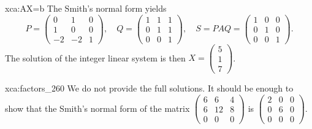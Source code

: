     

\begin{sol}{xca:AX=b}
	The Smith's normal form yields 
	\[
		P=\begin{pmatrix}
			0 & 1 & 0\\
			1 & 0 & 0\\
			-2 & -2 & 1
		\end{pmatrix},
		\quad
		Q=\begin{pmatrix}
			1 & 1 & 1\\
			0 & 1 & 1\\
			0 & 0 & 1
		\end{pmatrix},\quad
		S=PAQ=\begin{pmatrix}
			1 & 0 & 0\\
			0 & 1 & 0\\
			0 & 0 & 1
		\end{pmatrix}.
	\]
	The solution of the integer linear system is then
	$X=\begin{pmatrix}
		5\\
		1\\
		7
	\end{pmatrix}$. 
\end{sol}

\begin{sol}{xca:factors_260}
	We do not provide the full solutions. It should be enough to
	show that the Smith's normal form
	of the matrix $\begin{pmatrix}
		6 & 6 & 4\\
		6 & 12 & 8\\
		0 & 0 & 0
	\end{pmatrix}$ is $\begin{pmatrix}
		2 & 0 & 0\\
		0 & 6 & 0\\
		0 & 0 & 0
	\end{pmatrix}$. 
\end{sol}

